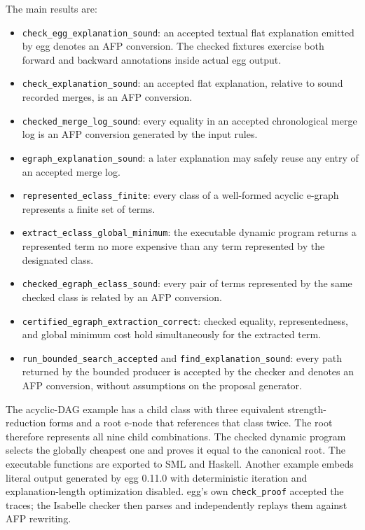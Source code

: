 \documentclass[11pt,a4paper]{article}
\begin{document}
The main results are:
\begin{itemize}
  \item \texttt{check\_egg\_explanation\_sound}: an accepted textual flat
        explanation emitted by egg denotes an AFP conversion.  The checked
        fixtures exercise both forward and backward annotations inside actual
        egg output.
  \item \texttt{check\_explanation\_sound}: an accepted flat explanation,
        relative to sound recorded merges, is an AFP conversion.
  \item \texttt{checked\_merge\_log\_sound}: every equality in an accepted
        chronological merge log is an AFP conversion generated by the input
        rules.
  \item \texttt{egraph\_explanation\_sound}: a later explanation may safely
        reuse any entry of an accepted merge log.
  \item \texttt{represented\_eclass\_finite}: every class of a well-formed
        acyclic e-graph represents a finite set of terms.
  \item \texttt{extract\_eclass\_global\_minimum}: the executable dynamic
        program returns a represented term no more expensive than any term
        represented by the designated class.
  \item \texttt{checked\_egraph\_eclass\_sound}: every pair of terms
        represented by the same checked class is related by an AFP conversion.
  \item {\footnotesize\texttt{certified\_egraph\_extraction\_correct}}: checked
        equality, representedness, and global minimum cost hold simultaneously
        for the extracted term.
  \item \texttt{run\_bounded\_search\_accepted} and
        \texttt{find\_explanation\_sound}: every path returned by the bounded
        producer is accepted by the checker and denotes an AFP conversion,
        without assumptions on the proposal generator.
\end{itemize}

The acyclic-DAG example has a child class with three equivalent
strength-reduction forms and a root e-node that references that class twice.
The root therefore represents all nine child combinations.  The checked
dynamic program selects the globally cheapest one and proves it equal to the
canonical root.  The executable functions are exported to SML and Haskell.
Another example embeds literal output generated by egg 0.11.0 with deterministic
iteration and explanation-length optimization disabled.  egg's own
\texttt{check\_proof} accepted the traces; the Isabelle checker then parses and
independently replays them against AFP rewriting.
\end{document}
